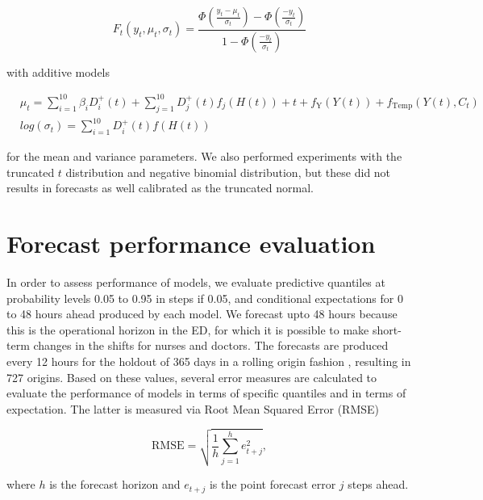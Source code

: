 \documentclass[]{elsarticle} %
\begin{document}
\begin{equation}
F_t(y_t,\mu_t,\sigma_t) =  \frac{\Phi\left( \frac{y_t-\mu_t}{\sigma_t} \right) - \Phi\left( \frac{-y_t}{\sigma_t} \right)}{1 - \Phi\left( \frac{-y_t}{\sigma_t} \right)}
\label{eq:truncatedn}
\end{equation}

with additive models

\begin{align*}
    & \mu_t = \sum_{i=1}^10 \beta_i D^{+}_i(t) + \sum_{j=1}^10 D^{+}_j(t) f_j(H(t)) + t + f_\text{Y}(Y(t)) + f_\text{Temp}(Y(t),C_t) \\
    & log(\sigma_t) = \sum_{i=1}^10 D^{+}_i(t) f(H(t))
\end{align*}

for the mean and variance parameters. We also performed experiments with the truncated \(t\) distribution and negative binomial distribution, but these did not results in forecasts as well calibrated as the truncated normal.

\hypertarget{accuracy}{%
\section{Forecast performance evaluation}\label{accuracy}}

In order to assess performance of models, we evaluate predictive quantiles at probability levels 0.05 to 0.95 in steps if 0.05, and conditional expectations for 0 to 48 hours ahead produced by each model. We forecast upto 48 hours because this is the operational horizon in the ED, for which it is possible to make short-term changes in the shifts for nurses and doctors. The forecasts are produced every 12 hours for the holdout of 365 days in a rolling origin fashion \citep{Tashman2000}, resulting in 727 origins. Based on these values, several error measures are calculated to evaluate the performance of models in terms of specific quantiles and in terms of expectation. The latter is measured via Root Mean Squared Error (RMSE)

\begin{equation}
  \mathrm{RMSE} = \sqrt{\frac{1}{h} \sum_{j=1}^h e_{t+j}^2} ,
  \label{eq:RMSE}
\end{equation}

where \(h\) is the forecast horizon and \(e_{t+j}\) is the point forecast error \(j\) steps ahead.
\end{document}

